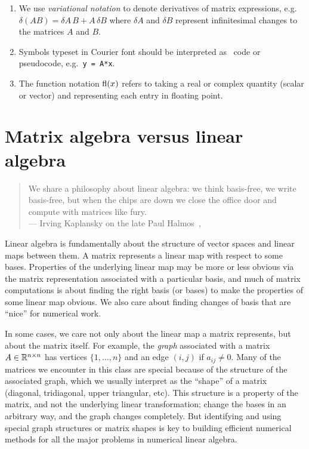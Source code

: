 \documentclass[12pt, leqno]{article} %
\begin{document}
\begin{enumerate}
\item
  We use {\em variational notation} to denote derivatives of matrix
  expressions, e.g.~$\delta (AB) = \delta A \, B + A \, \delta B$ where
  $\delta A$ and $\delta B$ represent infinitesimal changes to the
  matrices $A$ and $B$.

\item
  Symbols typeset in Courier font should be interpreted as \matlab\ code
  or pseudocode, e.g.~{\tt y = A*x}.

\item
  The function notation $\operatorname{fl}(x)$ refers to taking a real or complex
  quantity (scalar or vector) and representing each entry in floating
  point.

\end{enumerate}


\section{Matrix algebra versus linear algebra}

\begin{quotation}
  We share a philosophy about linear algebra: we think basis-free, we write basis-free, but when the chips are down we close the office door and compute with matrices like fury. \\
  \hspace*{\fill} --- Irving Kaplansky
  on the late Paul Halmos~\cite{Ewing:1991:Halmos},
\end{quotation}

Linear algebra is fundamentally about the structure of vector spaces
and linear maps between them.  A matrix represents a linear map with
respect to some bases.  Properties of the underlying linear map may
be more or less obvious via the matrix representation associated with
a particular basis, and much of matrix computations is about finding
the right basis (or bases) to make the properties of some linear map
obvious.  We also care about finding changes of basis that are ``nice''
for numerical work.

In some cases, we care not only about the linear map a matrix
represents, but about the matrix itself.  For example, the {\em graph}
associated with a matrix $A \in \mathbb{R}^{n \times n}$ has vertices $\{1,
\ldots, n\}$ and an edge $(i,j)$ if $a_{ij} \neq 0$.  Many of the
matrices we encounter in this class are special because of the structure
of the associated graph, which we usually interpret as the ``shape'' of
a matrix (diagonal, tridiagonal, upper triangular, etc).  This structure
is a property of the matrix, and not the underlying linear
transformation; change the bases in an arbitrary way, and the graph
changes completely.  But identifying and using special graph structures
or matrix shapes is key to building efficient numerical methods for all
the major problems in numerical linear algebra.
\end{document}

